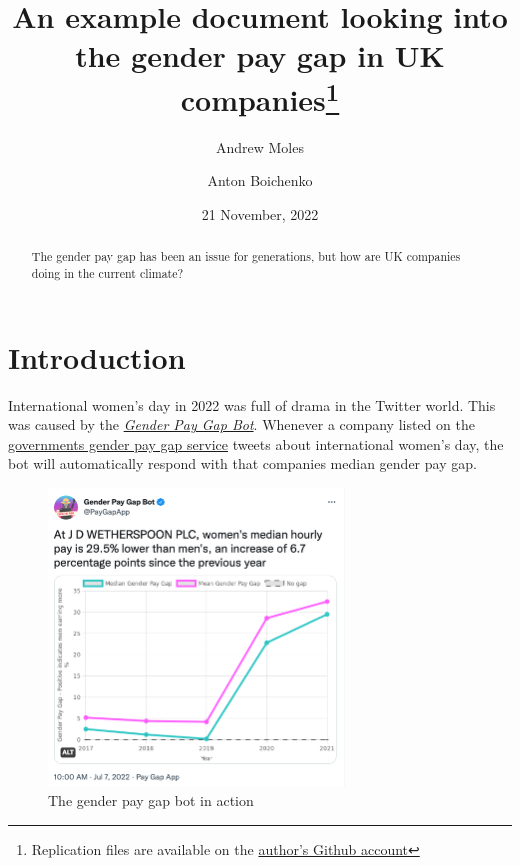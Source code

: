 \documentclass[
  11pt,
]{article}
\title{An example document looking into the gender pay gap in UK
companies\thanks{Replication files are available on the
\href{https://github.com/andrewmoles2/gender_pay_gap_example}{author's
Github account}}}
\author{Andrew Moles \and Anton Boichenko}
\date{21 November, 2022}
\begin{document}
\maketitle
\begin{abstract}
The gender pay gap has been an issue for generations, but how are UK
companies doing in the current climate?
\end{abstract}
\ifdefined\Shaded\renewenvironment{Shaded}{\begin{tcolorbox}[enhanced, frame hidden, sharp corners, boxrule=0pt, borderline west={3pt}{0pt}{shadecolor}, breakable, interior hidden]}{\end{tcolorbox}}\fi

\newpage

\raggedright
\newpage
\setcounter{tocdepth}{4}
\tableofcontents
\listoffigures
\listoftables

\newpage

\hypertarget{introduction}{%
\section{Introduction}\label{introduction}}

International women's day in 2022 was full of drama in the Twitter
world. This was caused by the
\href{https://genderpaygap.app/}{\emph{Gender Pay Gap Bot}}. Whenever a
company listed on the
\href{https://gender-pay-gap.service.gov.uk/}{governments gender pay gap
service} tweets about international women's day, the bot will
automatically respond with that companies median gender pay gap.

\begin{figure}

{\centering \includegraphics[width=0.7\textwidth,height=\textheight]{pay_gap_bot.png}

}

\caption{The gender pay gap bot in action}

\end{figure}
\end{document}
